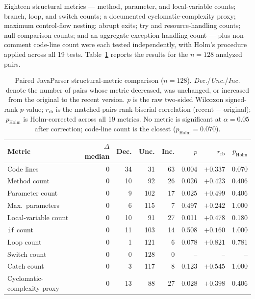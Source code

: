 Eighteen structural metrics --- method, parameter, and local-variable counts; branch, loop, and switch counts; a documented cyclomatic-complexity proxy; maximum control-flow nesting; abrupt exits; try and resource-handling counts; null-comparison counts; and an aggregate exception-handling count --- plus non-comment code-line count were each tested independently, with Holm's procedure applied across all 19 tests.
Table~\ref{tab:or-javaparser} reports the results for the $n=128$ analyzed pairs.

\begin{table}[htbp]
\centering
\caption{Paired JavaParser structural-metric comparison ($n=128$).
\emph{Dec.}/\emph{Unc.}/\emph{Inc.} denote the number of pairs whose metric decreased, was unchanged, or increased from the original to the recent version.
$p$ is the raw two-sided Wilcoxon signed-rank $p$-value; $r_{\text{rb}}$ is the matched-pairs rank-biserial correlation (recent $-$ original); $p_{\text{Holm}}$ is Holm-corrected across all 19 metrics.
No metric is significant at $\alpha=0.05$ after correction; code-line count is the closest ($p_{\text{Holm}}=0.070$).}
\label{tab:or-javaparser}
\small
\begin{tabular}{lrrrrrrr}
\toprule
Metric & $\Delta$ median & Dec. & Unc. & Inc. & $p$ & $r_{\text{rb}}$ & $p_{\text{Holm}}$ \\
\midrule
Code lines                   & $0$ & 34 & 31  & 63 & 0.004 & $+0.337$ & 0.070 \\
Method count                 & $0$ & 10 & 92  & 26 & 0.026 & $+0.423$ & 0.406 \\
Parameter count              & $0$ & 9  & 102 & 17 & 0.025 & $+0.499$ & 0.406 \\
Max.\ parameters             & $0$ & 6  & 115 & 7  & 0.497 & $+0.242$ & 1.000 \\
Local-variable count         & $0$ & 10 & 91  & 27 & 0.011 & $+0.478$ & 0.180 \\
\texttt{if} count            & $0$ & 11 & 103 & 14 & 0.508 & $+0.160$ & 1.000 \\
Loop count                   & $0$ & 1  & 121 & 6  & 0.078 & $+0.821$ & 0.781 \\
Switch count                 & $0$ & 0  & 128 & 0  & --    & --       & --    \\
Catch count                  & $0$ & 3  & 117 & 8  & 0.123 & $+0.545$ & 1.000 \\
Cyclomatic-complexity proxy  & $0$ & 13 & 88  & 27 & 0.028 & $+0.398$ & 0.406 \\

\end{tabular}
\end{table}
